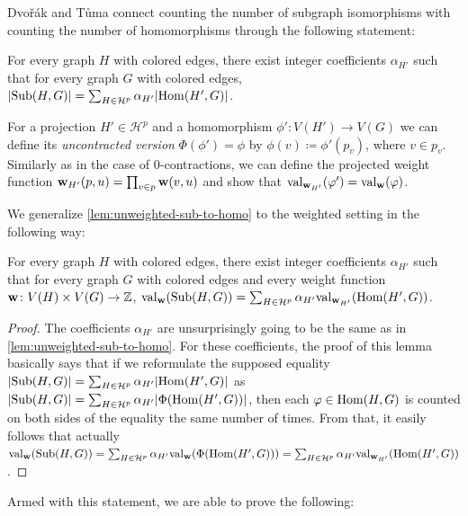 Dvo\v{r}\'ak and T\r{u}ma connect counting the number of subgraph isomorphisms with counting the number of homomorphisms through the following statement:

\begin{lemma} \label{lem:unweighted-sub-to-homo}
	For every graph $H$ with colored edges, there exist integer coefficients $\alpha_{H'}$ such that for every graph $G$ with colored edges, $|\mathrm{Sub}(H, G)| = \sum_{H \in \mathcal{H}^p} \alpha_{H'} |\mathrm{Hom}(H', G)|$.
\end{lemma}

For a projection $H' \in \mathcal{H}^p$ and a homomorphism $\phi' \colon V(H') \to V(G)$ we can define its \emph{uncontracted version} $\Phi(\phi') = \phi$ by $\phi(v) \coloneqq \phi'(p_v)$, where $v \in p_v$. Similarly as in the case of $0$-contractions, we can define the projected weight function $\mathbf{w}_{H'}(p, u) = \prod_{v \in p} \mathbf{w}(v, u)$ and show that $\mathrm{val}_{\mathbf{w}_{H'}}(\varphi') = \mathrm{val}_{\mathbf{w}}(\varphi)$.

We generalize \cref{lem:unweighted-sub-to-homo} to the weighted setting in the following way:
\begin{lemma} \label{lem:weighted-sub-to-homo}
	For every graph $H$ with colored edges, there exist integer coefficients $\alpha_{H'}$ such that for every graph $G$ with colored edges and every weight function $\mathbf{w}\colon V(H) \times V(G) \to \mathbb{Z}$,
	$\mathrm{val}_{\mathbf{w}}(\mathrm{Sub}(H, G)) = \sum_{H \in \mathcal{H}^p} \alpha_{H'} \mathrm{val}_{\mathbf{w}_{H'}}(\mathrm{Hom}(H', G))$.
\end{lemma}

\begin{proof}
	The coefficients $\alpha_{H'}$ are unsurprisingly going to be the same as in \cref{lem:unweighted-sub-to-homo}. For these coefficients, the proof of this lemma basically says that if we reformulate the supposed equality $|\mathrm{Sub}(H, G)| = \sum_{H \in \mathcal{H}^p} \alpha_{H'} |\mathrm{Hom}(H', G)|$ as $|\mathrm{Sub}(H, G)| = \sum_{H \in \mathcal{H}^p} \alpha_{H'} |\Phi(\mathrm{Hom}(H', G))|$, then each $\varphi \in \mathrm{Hom}(H, G)$ is counted on both sides of the equality the same number of times. From that, it easily follows that actually $\mathrm{val}_{\mathbf{w}}(\mathrm{Sub}(H, G)) = \sum_{H \in \mathcal{H}^p} \alpha_{H'} \mathrm{val}_{\mathbf{w}}(\Phi(\mathrm{Hom}(H', G))) = \sum_{H \in \mathcal{H}^p} \alpha_{H'} \mathrm{val}_{\mathbf{w}_{H'}}(\mathrm{Hom}(H', G))$.
\end{proof}

Armed with this statement, we are able to prove the following:

